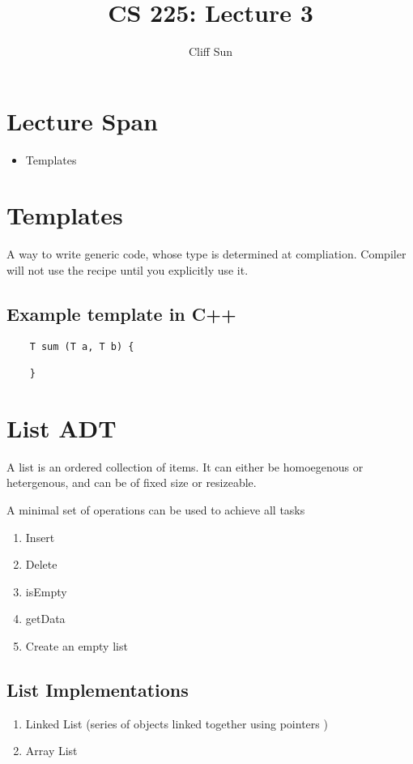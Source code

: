 \documentclass{article}
\title{CS 225: Lecture 3}
\author{Cliff Sun}
\newtheorem{one minute paper}[theorem]{One Minute Paper}
\begin{document}
\maketitle

\section*{
    Lecture Span
}

\begin{itemize}
    \item Templates
\end{itemize}

\section*{Templates}
A way to write generic code, whose type is determined at compliation. Compiler will not use the recipe until you explicitly use it. 

\subsection*{Example template in C++}
\begin{verbatim}
    T sum (T a, T b) {
        
    }
\end{verbatim}

\section*{List ADT}

A list is an ordered collection of items. It can either be homoegenous or hetergenous, and can be of fixed size or resizeable.

A minimal set of operations can be used to achieve all tasks
\begin{enumerate}
    \item Insert
    \item Delete
    \item isEmpty
    \item getData
    \item Create an empty list
\end{enumerate}

\subsection*{List Implementations}

\begin{enumerate}
    \item Linked List (series of objects linked together using pointers )
    \item Array List
\end{enumerate}
\end{document}
